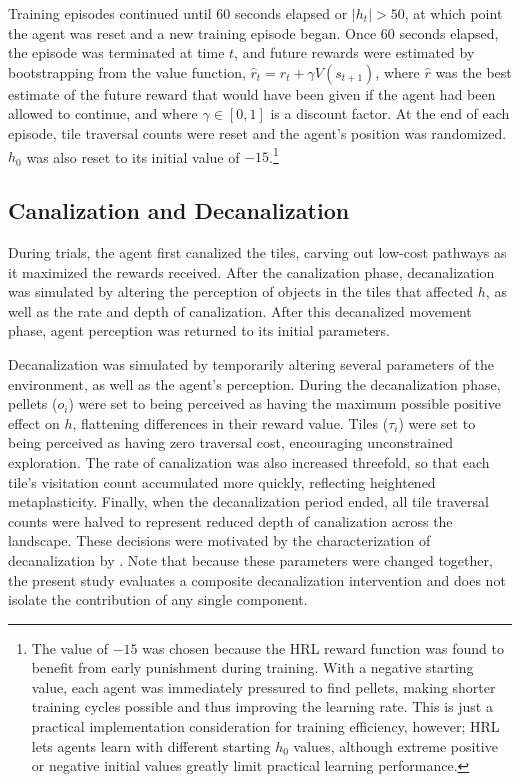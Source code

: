 Training episodes continued until 60 seconds elapsed or \(|h_t| > 50\), at which point the agent was reset and a new training episode began. Once 60 seconds elapsed, the episode was terminated at time \(t\), and future rewards were estimated by bootstrapping from the value function, $\hat{r}_t = r_t + \gamma V(s_{t+1})$, where \(\hat{r}\) was the best estimate of the future reward that would have been given if the agent had been allowed to continue, and where $\gamma \in [0, 1]$ is a discount factor. At the end of each episode, tile traversal counts were reset and the agent's position was randomized. \(h_0\) was also reset to its initial value of \(-15\).\footnote{The value of \(-15\) was chosen because the HRL reward function was found to benefit from early punishment during training. With a negative starting value, each agent was immediately pressured to find pellets, making shorter training cycles possible and thus improving the learning rate. This is just a practical implementation consideration for training efficiency, however; HRL lets agents learn with different starting \(h_0\) values, although extreme positive or negative initial values greatly limit practical learning performance.}

\subsection{Canalization and Decanalization}

During trials, the agent first canalized the tiles, carving out low-cost pathways as it maximized the rewards received. After the canalization phase, decanalization was simulated by altering the perception of objects in the tiles that affected \(h\), as well as the rate and depth of canalization. After this decanalized movement phase, agent perception was returned to its initial parameters.

Decanalization was simulated by temporarily altering several parameters of the environment, as well as the agent’s perception. During the decanalization phase, pellets (\(o_i\)) were set to being perceived as having the maximum possible positive effect on \(h\), flattening differences in their reward value. Tiles (\(\tau_i\)) were set to being perceived as having zero traversal cost, encouraging unconstrained exploration. The rate of canalization was also increased threefold, so that each tile’s visitation count accumulated more quickly, reflecting heightened metaplasticity. Finally, when the decanalization period ended, all tile traversal counts were halved to represent reduced depth of canalization across the landscape. These decisions were motivated by the characterization of decanalization by \cite{juliani_deep_2024}. Note that because these parameters were changed together, the present study evaluates a composite decanalization intervention and does not isolate the contribution of any single component.

